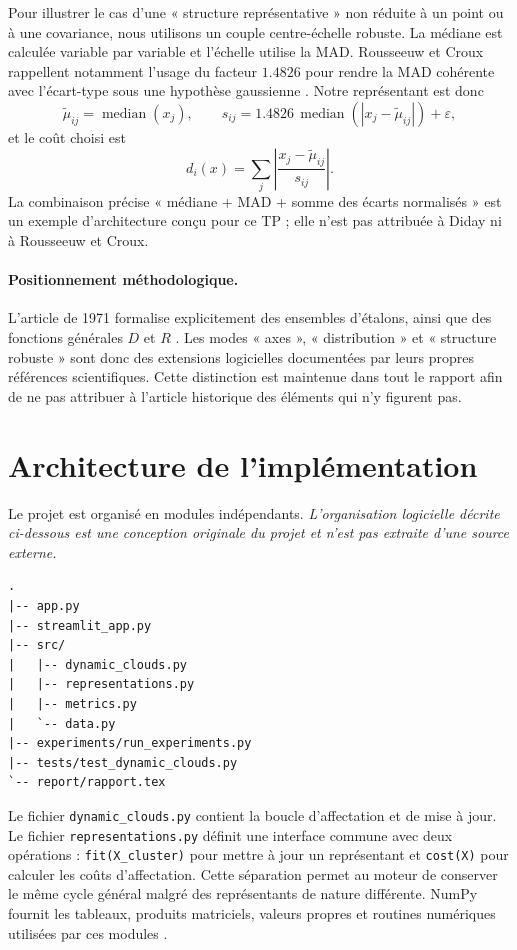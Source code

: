 \documentclass[12pt,a4paper]{article}
\begin{document}
Pour illustrer le cas d'une « structure représentative » non réduite à un point ou à une covariance, nous utilisons un couple centre-échelle robuste. La médiane est calculée variable par variable et l'échelle utilise la MAD. Rousseeuw et Croux rappellent notamment l'usage du facteur $1.4826$ pour rendre la MAD cohérente avec l'écart-type sous une hypothèse gaussienne \cite{rousseeuwcroux1993}. Notre représentant est donc
\[
\widetilde{\mu}_{ij}=\operatorname{median}(x_j),
\qquad
s_{ij}=1.4826\,\operatorname{median}(|x_j-\widetilde{\mu}_{ij}|)+\varepsilon,
\]
et le coût choisi est
\[
d_i(x)=\sum_j\left|\frac{x_j-\widetilde{\mu}_{ij}}{s_{ij}}\right|.
\]
La combinaison précise « médiane + MAD + somme des écarts normalisés » est un exemple d'architecture conçu pour ce TP ; elle n'est pas attribuée à Diday ni à Rousseeuw et Croux.

\paragraph{Positionnement méthodologique.}
L'article de 1971 formalise explicitement des ensembles d'étalons, ainsi que des fonctions générales $D$ et $R$ \cite[pp.~20--21]{diday1971}. Les modes « axes », « distribution » et « structure robuste » sont donc des extensions logicielles documentées par leurs propres références scientifiques. Cette distinction est maintenue dans tout le rapport afin de ne pas attribuer à l'article historique des éléments qui n'y figurent pas.

\section{Architecture de l'implémentation}

Le projet est organisé en modules indépendants. \textit{L'organisation logicielle décrite ci-dessous est une conception originale du projet et n'est pas extraite d'une source externe.}

\begin{verbatim}
.
|-- app.py
|-- streamlit_app.py
|-- src/
|   |-- dynamic_clouds.py
|   |-- representations.py
|   |-- metrics.py
|   `-- data.py
|-- experiments/run_experiments.py
|-- tests/test_dynamic_clouds.py
`-- report/rapport.tex
\end{verbatim}

Le fichier \texttt{dynamic\_clouds.py} contient la boucle d'affectation et de mise à jour. Le fichier \texttt{representations.py} définit une interface commune avec deux opérations : \texttt{fit(X\_cluster)} pour mettre à jour un représentant et \texttt{cost(X)} pour calculer les coûts d'affectation. Cette séparation permet au moteur de conserver le même cycle général malgré des représentants de nature différente. NumPy fournit les tableaux, produits matriciels, valeurs propres et routines numériques utilisées par ces modules \cite{harris2020}.
\end{document}
